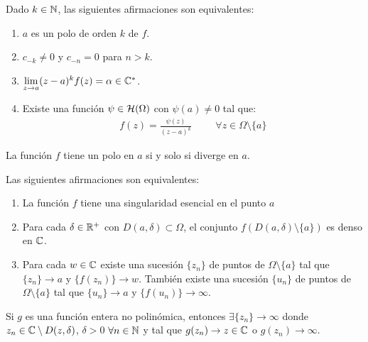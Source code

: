 \documentclass[12pt]{article}
\begin{document}
    \begin{prop} Dado $k \in \mathbb{N}$, las siguientes afirmaciones son equivalentes:
        \begin{enumerate}
            \item $a$ es un polo de orden $k$ de $f$.
            \item $c_{-k}\neq 0$ y $c_{-n} = 0$ para $n> k$.
            \item $\lim\limits_{z \to a}(z-a)^kf(z) = \alpha \in \mathbb{C}^*$.
            \item Existe una función $\psi\in \mathcal{H}(\Omega)$ con $\psi(a) \neq 0$ tal que:
            \begin{gather*}
                f(z) = \frac{\psi(z)}{(z-a)^k} \hspace{1cm} \forall z \in \Omega \setminus \{a\}
            \end{gather*}
        \end{enumerate}
    \end{prop}

    \begin{prop}
        La función $f$ tiene un polo en $a$ si y solo si diverge en $a$.
    \end{prop}

    \begin{teo} Las siguientes afirmaciones son equivalentes:
    \begin{enumerate}
        \item La función $f$ tiene una singularidad esencial en el punto $a$
        \item Para cada $\delta \in \mathbb{R}^+$ con $D(a, \delta)\subset \Omega$, el conjunto $f(D(a, \delta)\setminus \{a\})$ es denso en $\mathbb{C}$.
        \item Para cada $w\in \mathbb{C}$ existe una sucesión $\{z_n\}$ de puntos de $\Omega \setminus \{a\}$ tal que $\{z_n\} \to a$ y $\{f(z_n)\}\to w$. También existe una sucesión $\{u_n\}$ de puntos de $\Omega \setminus \{a\}$ tal que $\{u_n\} \to a$ y $\{f(u_n)\} \to \infty$.
    \end{enumerate}
    \end{teo}

    \begin{coro}
        Si $g$ es una función entera no polinómica, entonces $\exists \{z_n\}\to \infty$ donde $z_n\in \mathbb{C}\setminus D(z, \delta)$, $\delta>0$ $\forall n \in \mathbb{N}$ y tal que $g(z_n) \to z\in \mathbb{C}$ o $g(z_n) \to \infty$.
    \end{coro}
\end{document}
